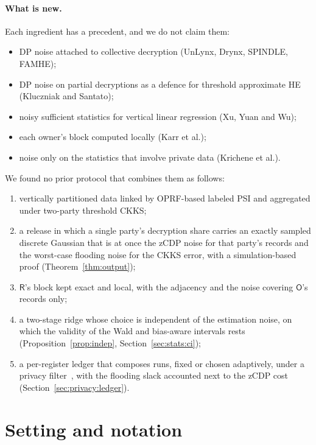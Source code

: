 \documentclass[11pt]{article}
\theoremstyle{definition}
\theoremstyle{plain}
\newcommand{\Party}[1]{\textsf{#1}}
\newcommand{\Rp}{\Party{R}}
\newcommand{\Op}{\Party{O}}
\begin{document}
\paragraph{What is new.} Each ingredient has a precedent, and we do not claim them:
\begin{itemize}[noitemsep]
  \item DP noise attached to collective decryption (UnLynx, Drynx, SPINDLE, FAMHE);
  \item DP noise on partial decryptions as a defence for threshold approximate HE (Kluczniak and Santato);
  \item noisy sufficient statistics for vertical linear regression (Xu, Yuan and Wu);
  \item each owner's block computed locally (Karr et al.);
  \item noise only on the statistics that involve private data (Krichene et al.).
\end{itemize}
We found no prior protocol that combines them as follows:
\begin{enumerate}[noitemsep, label=(\roman*)]
  \item vertically partitioned data linked by OPRF-based labeled PSI and aggregated under two-party threshold CKKS;
  \item a release in which a single party's decryption share carries an exactly sampled discrete Gaussian that is at once the zCDP noise for that party's records and the worst-case flooding noise for the CKKS error, with a simulation-based proof (Theorem~\ref{thm:output});
  \item $\Rp$'s block kept exact and local, with the adjacency and the noise covering $\Op$'s records only;
  \item a two-stage ridge whose choice is independent of the estimation noise, on which the validity of the Wald and bias-aware intervals rests (Proposition~\ref{prop:indep}, Section~\ref{sec:stats:ci});
  \item a per-register ledger that composes runs, fixed or chosen adaptively, under a privacy filter~\cite{rogers2016odometers}, with the flooding slack accounted next to the zCDP cost (Section~\ref{sec:privacy:ledger}).
\end{enumerate}

\section{Setting and notation}
\label{sec:setup}
\end{document}
